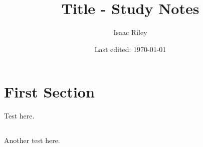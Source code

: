 \documentclass[a4paper]{article}
\title{Title - Study Notes}
\author{Isaac Riley}
\date{Last edited: \today}
\begin{document}
\maketitle
\tableofcontents
\newpage



\setcounter{section}{-1}
\section{First Section}
Test here.
\subsection{}
Another test here.
\subsubsection{}
\end{document}
